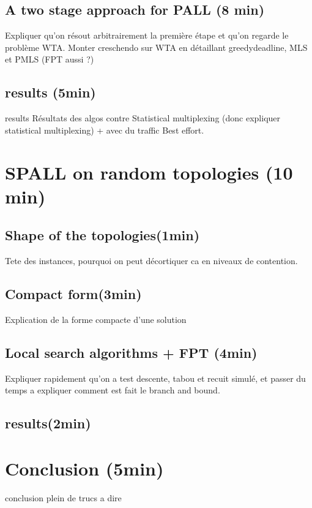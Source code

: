 \documentclass[10 pt]{beamer}
\begin{document}
\subsection{A two stage approach for PALL (8 min)}
\begin{frame}
Expliquer qu'on résout arbitrairement la première étape et qu'on regarde le problème WTA.
Monter creschendo sur WTA en détaillant greedydeadline, MLS et PMLS (FPT aussi ?)
\end{frame}
\subsection{results (5min)}
\begin{frame}{results}
Résultats des algos contre Statistical multiplexing (donc expliquer statistical multiplexing) + avec du traffic Best effort.
\end{frame}

\section{SPALL on random topologies (10 min)}
\subsection{Shape of the topologies(1min)}
\begin{frame}
Tete des instances, pourquoi on peut décortiquer ca en niveaux de contention.
\end{frame}
\subsection{Compact form(3min)}
\begin{frame}
Explication de la forme compacte d'une solution
\end{frame}
\subsection{Local search algorithms + FPT (4min)}
\begin{frame}
Expliquer rapidement qu'on a test descente, tabou et recuit simulé, et passer du temps a expliquer comment est fait le branch and bound.
\end{frame}
\subsection{results(2min)}
\section{Conclusion (5min)}
\begin{frame}{conclusion}
plein de trucs a dire
\end{frame}
\end{document}
